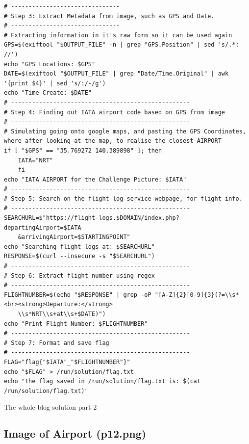 \begin{verbatim}
# -------------------------------
# Step 3: Extract Metadata from image, such as GPS and Date.
# -------------------------------
# Extracting information in it's raw form so it can be used again
GPS=$(exiftool "$OUTPUT_FILE" -n | grep "GPS.Position" | sed 's/.*: //')
echo "GPS Locations: $GPS"
DATE=$(exiftool "$OUTPUT_FILE" | grep "Date/Time.Original" | awk '{print $4}' | sed 's/:/-/g')
echo "Time Create: $DATE"
# ---------------------------------------------------
# Step 4: Finding out IATA airport code based on GPS from image
# ---------------------------------------------------
# Simulating going onto google maps, and pasting the GPS Coordinates, where after looking at the map, to realise the closest AIRPORT
if [ "$GPS" == "35.769272 140.389898" ]; then 
	IATA="NRT"
	fi
echo "IATA AIRPORT for the Challenge Picture: $IATA"
# ---------------------------------------------------
# Step 5: Search on the flight log service webpage, for flight info.
# ---------------------------------------------------
SEARCHURL=$"https://flight-logs.$DOMAIN/index.php?departingAirport=$IATA
    &arrivingAirport=$STARTINGPOINT"
echo "Searching flight logs at: $SEARCHURL"
RESPONSE=$(curl --insecure -s "$SEARCHURL")
# ---------------------------------------------------
# Step 6: Extract flight number using regex
# ---------------------------------------------------
FLIGHTNUMBER=$(echo "$RESPONSE" | grep -oP "[A-Z]{2}[0-9]{3}(?=\\s*<br><strong>Departure:</strong>
    \\s*NRT\\s+at\\s+$DATE)")
echo "Print Flight Number: $FLIGHTNUMBER"
# ---------------------------------------------------
# Step 7: Format and save flag
# ---------------------------------------------------
FLAG="flag{"$IATA"_"$FLIGHTNUMBER"}"
echo "$FLAG" > /run/solution/flag.txt
echo "The flag saved in /run/solution/flag.txt is: $(cat /run/solution/flag.txt)"
\end{verbatim}
\begin{listing}[H]
\caption{The whole blog solution part 2}
\end{listing}

\subsection{Image of Airport (p12.png)}\label{apx:p12}


